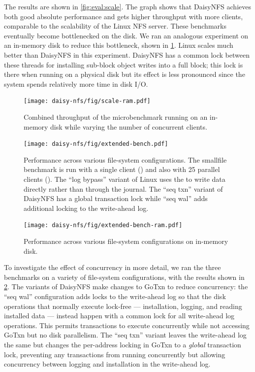 The results are shown in \cref{fig:eval:scale}. The graph shows that DaisyNFS
achieves both good absolute performance and gets higher throughput with more
clients, comparable to the scalability of the Linux NFS server. These benchmarks
eventually become bottlenecked on the disk. We ran an analogous experiment on an
in-memory disk to reduce this bottleneck, shown in \cref{fig:eval:scale-ram}.
Linux scales much better than DaisyNFS in this experiment. DaisyNFS has a common
lock between these threads for installing sub-block object writes into a full
block; this lock is there when running on a physical disk but its effect is less
pronounced since the system spends relatively more time in disk I/O.

\begin{figure}
  \texttt{[image: daisy-nfs/fig/scale-ram.pdf]}
  \caption[Concurrent smallfile performance, with RAM disk]%
  {Combined throughput of the  microbenchmark running on an
    in-memory disk while varying the number of concurrent clients.}
  \label{fig:eval:scale-ram}
\end{figure}

\begin{figure}[hp]
  \texttt{[image: daisy-nfs/fig/extended-bench.pdf]}
  \caption{Performance across various file-system configurations. The smallfile
    benchmark is run with a single client () and also with 25
    parallel clients (). The ``log bypass'' variant of Linux
    uses the  to write data directly rather than through the
    journal. The ``seq txn'' variant of DaisyNFS has a global transaction lock
    while ``seq wal'' adds additional locking to the write-ahead log.}
  \label{fig:bench-configs}
\end{figure}

\begin{figure}[hp]
  \texttt{[image: daisy-nfs/fig/extended-bench-ram.pdf]}
  \caption{Performance across various file-system configurations on in-memory disk.}
  \label{fig:bench-configs-ram}
\end{figure}


To investigate the effect of concurrency in more detail, we ran the three
benchmarks on a variety of file-system configurations, with the results shown in
\cref{fig:bench-configs}.
The variants of DaisyNFS make changes to GoTxn to reduce concurrency: the
``seq wal'' configuration adds locks to the write-ahead log so that the
disk operations that normally execute lock-free --- installation, logging, and
reading installed data --- instead happen with a common lock for all write-ahead
log operations. This permits transactions to execute concurrently while not
accessing GoTxn but no disk parallelism. The ``seq txn'' variant leaves the
write-ahead log the same but changes the per-address locking in GoTxn to a
\emph{global} transaction lock, preventing any transactions from running
concurrently but allowing concurrency between logging and installation in the
write-ahead log.

